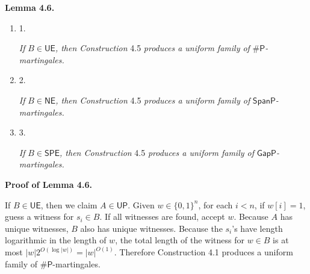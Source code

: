 \par\medskip\noindent\textbf{
\textbf{Lemma 4.6}\textbf{.}
}\par



\begin{enumerate}


\item[] 
1. 


\emph{If }$B\in\mathsf{UE}$\emph{, then Construction }4.5\emph{ produces a uniform family of }${\mathsf{\#}\mathsf{P}}$\emph{-martingales.}\par





\item[] 
2. 


\emph{If }$B\in\mathsf{NE}$\emph{, then Construction }4.5\emph{ produces a uniform family of }$\mathsf{SpanP}$\emph{-martingales.}\par





\item[] 
3. 


\emph{If }$B\in\mathsf{SPE}$\emph{, then Construction }4.5\emph{ produces a uniform family of }$\mathsf{GapP}$\emph{-martingales.}\par





\end{enumerate}






\par\medskip\noindent\textbf{Proof of Lemma 4.6.}\par




If $B\in\mathsf{UE}$, then we claim $A\in\mathsf{UP}$. Given $w\in\{0,1\}^{n}$, for each $i<n$, if $w[i]=1$, guess a witness for $s_{i}\in B$. If all witnesses are found, accept $w$. Because $A$ has unique witnesses, $B$ also has unique witnesses. Because the $s_{i}$’s have length logarithmic in the length of $w$, the total length of the witness for $w\in B$ is at most $|w|2^{O(\log|w|)}=|w|^{O(1)}$.
Therefore Construction 4.1 produces a uniform family of ${\mathsf{\#}\mathsf{P}}$-martingales.\par




